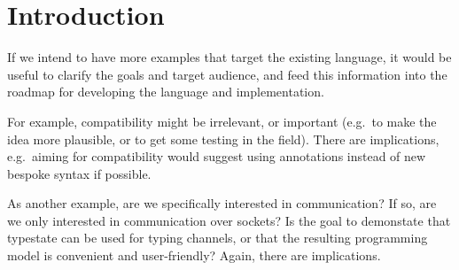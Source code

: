 \section{Introduction}

If we intend to have more examples that target the existing language,
it would be useful to clarify the goals and target audience, and feed
this information into the roadmap for developing the language and
implementation.

For example, compatibility might be irrelevant, or important (e.g.~to
make the idea more plausible, or to get some testing in the field).
There are implications, e.g.~aiming for compatibility would suggest
using annotations instead of new bespoke syntax if possible.

As another example, are we specifically interested in communication?
If so, are we only interested in communication over sockets? Is the
goal to demonstate that typestate can be used for typing channels, or
that the resulting programming model is convenient and user-friendly?
Again, there are implications.
